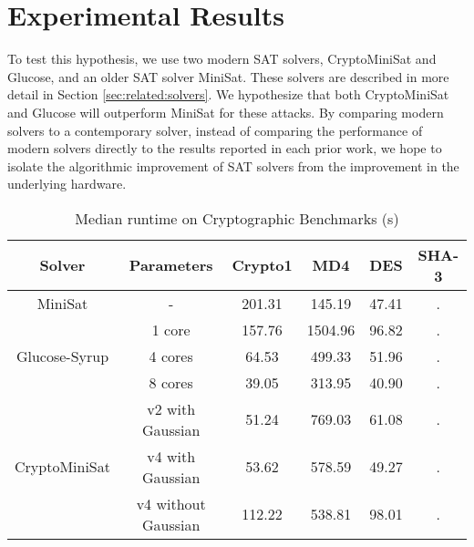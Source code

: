 \section{Experimental Results}
\label{sec:results}


To test this hypothesis, we use two modern SAT solvers, CryptoMiniSat and Glucose, and an older SAT solver MiniSat. These solvers are described in more detail in Section \ref{sec:related:solvers}. 
We hypothesize that both CryptoMiniSat and Glucose will outperform MiniSat for these attacks. By comparing modern solvers to a contemporary solver, instead of comparing the performance of modern solvers directly to the results reported in each prior work, we hope to isolate the algorithmic improvement of SAT solvers from the improvement in the underlying hardware.


\begin{table}[!htbp]
	\centering
	\begin{tabular}{|c|c|c|c|c|c|}
		\hline
		\textbf{Solver} & \textbf{Parameters} & \textbf{Crypto1} & \textbf{MD4} & \textbf{DES} & \textbf{SHA-3} \\
		\hline
		MiniSat & - & 201.31 & 145.19 & 47.41 & .\\
		\hline
		\multirow{3}{*}{Glucose-Syrup} & 1 core & 157.76 & 1504.96 & 96.82 & .\\ \cline{2-6}
		& 4 cores & 64.53 & 499.33 & 51.96 & .\\ \cline{2-6}
		& 8 cores & 39.05 & 313.95 & 40.90 & .\\
		\hline
		
		\multirow{3}{*}{CryptoMiniSat} & v2 with Gaussian & 51.24 & 769.03 & 61.08 & . \\ \cline{2-6}
		& v4 with Gaussian & 53.62 & 578.59 & 49.27 & . \\ \cline{2-6}
		& v4 without Gaussian & 112.22 & 538.81 & 98.01 & .\\
		\hline
	\end{tabular}
	
	\caption{Median runtime on Cryptographic Benchmarks (s)}
	\label{table:crypto1:runtime}
\end{table}